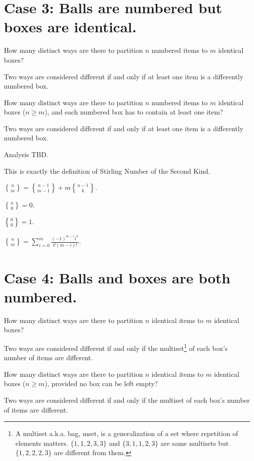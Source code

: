 \documentclass[a4paper]{article}
\begin{document}
\section{Case 3: Balls are numbered but boxes are identical.}

\begin{tcolorbox}[title = Problem 3.1]
    How many distinct ways are there to partition $n$ numbered items to $m$ identical boxes? 

    Two ways are considered different if and only if at least one item is a differently numbered box. 
\end{tcolorbox}

\begin{tcolorbox}[title = Problem 3.2]
    How many distinct ways are there to partition $n$ numbered items to $m$ identical boxes ($n \ge m$), and each numbered box has to contain at least one item? 

    Two ways are considered different if and only if at least one item is a differently numbered box. 
\end{tcolorbox}

Analysis TBD. 

This is exactly the definition of Stirling Number of the Second Kind. 

${n\brace m} = {n-1\brace m-1} + m{n-1\brace k}$.

${n\brace 0} = 0$.

${0\brace 0} = 1$.

${n\brace m} = \sum_{i=0}^{m}{\frac{(-1)^{m-i}i^{n}}{i!(m-i)!}}$.

\section{Case 4: Balls and boxes are both numbered.}

\begin{tcolorbox}[title = Problem 4.1]
    How many distinct ways are there to partition $n$ identical items to $m$ identical boxes? 

    Two ways are considered different if and only if the multiset\footnote{A multiset a.k.a. bag, mset, is a generalization of a set where repetition of elements matters. $\{1, 1, 2, 3, 3\}$ and $\{3, 1, 1, 2, 3\}$ are same multisets but $\{1, 2, 2, 2, 3\}$ are different from them.} of each box's number of items are different.
\end{tcolorbox}

\begin{tcolorbox}[title = Problem 4.2]
    How many distinct ways are there to partition $n$ identical items to $m$ identical boxes ($n \ge m$), provided no box can be left empty? 

    Two ways are considered different if and only if the multiset of each box's number of items are different.
\end{tcolorbox}
\end{document}
